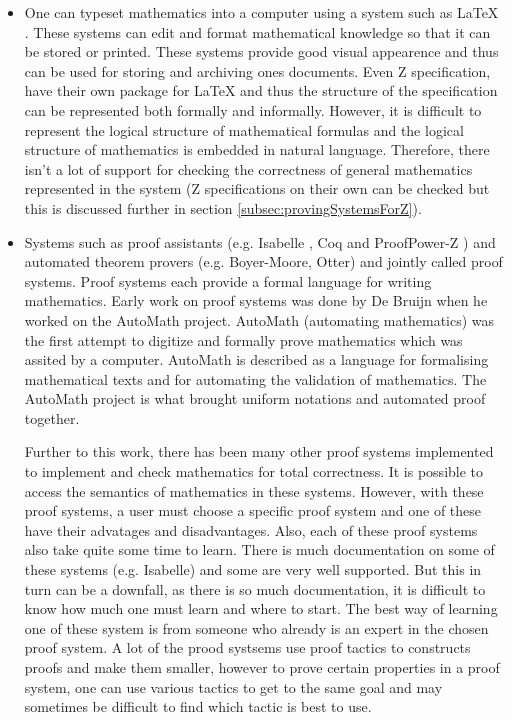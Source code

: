 \begin{itemize}
\item One can typeset mathematics into a computer using a system such as \LaTeX{} \cite{latex} . These systems can edit and format mathematical knowledge so that it can be stored or printed. These systems provide good visual appearence and thus can be used for storing and archiving ones documents. Even Z specification, have their own package for \LaTeX{} and thus the structure of the specification can be represented both formally and informally. However, it is difficult to represent the logical structure of mathematical formulas and the logical structure of mathematics is embedded in natural language. Therefore, there isn't a lot of support for checking the correctness of general mathematics represented in the system (Z specifications on their own can be checked but this is discussed further in section \ref{subsec:provingSystemsForZ}).

\item Systems such as proof assistants (e.g. Isabelle \cite{isabelle}, Coq \cite{coq} and ProofPower-Z \cite{pp}) and automated theorem provers (e.g. Boyer-Moore, Otter) and jointly called proof systems. Proof systems each provide a formal language for writing mathematics. Early work on proof systems was done by De Bruijn when he worked on the AutoMath \cite{selectedautomath} project. AutoMath (automating mathematics) was the first attempt to digitize and formally prove mathematics which was assited by a computer. AutoMath is described as a language for formalising mathematical texts and for automating the validation of mathematics. The AutoMath project is what brought uniform notations and automated proof together.

Further to this work, there has been many other proof systems implemented to implement and check mathematics for total correctness. It is possible to access the semantics of mathematics in these systems. However, with these proof systems, a user must choose a specific proof system and one of these have their advatages and disadvantages. Also, each of these proof systems also take quite some time to learn. There is much documentation on some of these systems (e.g. Isabelle) and some are very well supported. But this in turn can be a downfall, as there is so much documentation, it is difficult to know how much one must learn and where to start. The best way of learning one of these system is from someone who already is an expert in the chosen proof system. A lot of the prood systsems use proof tactics to constructs proofs and make them smaller, however to prove certain properties in a proof system, one can use various tactics to get to the same goal and may sometimes be difficult to find which tactic is best to use.


\end{itemize}
